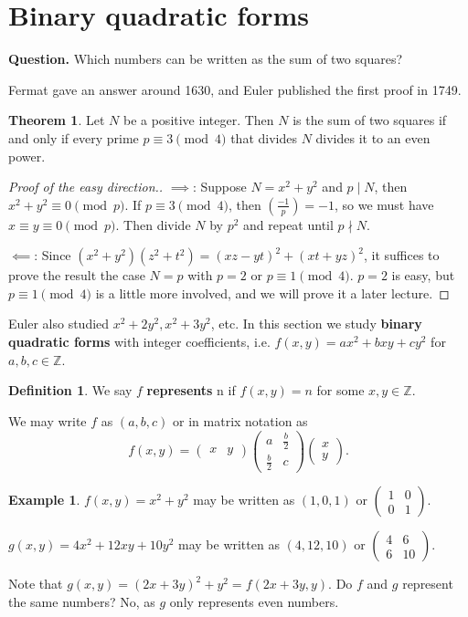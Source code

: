 \documentclass{article}
\theoremstyle{definition}
\newtheorem{theorem}{Theorem}[section]
\newtheorem{example}{Example}[section]
\newtheorem{defn}{Definition}[section]
\begin{document}
\section{Binary quadratic forms}


\textbf{Question.} Which numbers can be written as the sum of two squares?

Fermat gave an answer around 1630, and Euler published the first proof in 1749.

\begin{theorem}
    Let $N$ be a positive integer. Then $N$ is the sum of two squares if and only if every prime $p \equiv 3 \pmod{4}$ that divides $N$ divides it to an even power.
\end{theorem}
\begin{proof}[Proof of the easy direction.]
    $\implies$: Suppose $N=x^2+y^2$ and $p \mid N$, then $x^2 + y^2 \equiv 0 \pmod{p}$. If $p \equiv 3 \pmod{4}$, then $\left(\frac{-1}{p} \right) = -1$, so we must have $x\equiv y \equiv 0 \pmod{p}$. Then divide $N$ by $p^2$ and repeat until $p \nmid N$.
    \vspace{1mm}
    
    $\impliedby$: Since $(x^2+y^2)(z^2+t^2)=(xz-yt)^2+(xt+yz)^2$, it suffices to prove the result the case $N=p$ with $p=2$ or $p \equiv 1\pmod{4}$. $p=2$ is easy, but $p \equiv 1 \pmod{4}$ is a little more involved, and we will prove it a later lecture.
\end{proof}

Euler also studied $x^2+2y^2, x^2+3y^2$, etc. In this section we study \textbf{binary quadratic forms} with integer coefficients, i.e. $f(x,y)=ax^2+bxy+cy^2$ for $a,b,c \in \mathbb{Z}$.
\begin{defn}
    We say $f$ \textbf{represents} n if $f(x,y)=n$ for some $x,y \in \mathbb{Z}$.
\end{defn}
We may write $f$ as $(a,b,c)$ or in matrix notation as $$f(x,y) = \begin{pmatrix} x & y \end{pmatrix} \begin{pmatrix} a & \frac{b}{2} \\ \frac{b}{2} & c \end{pmatrix} \begin{pmatrix} x \\ y \end{pmatrix}.$$
\begin{example}
    $f(x,y)=x^2+y^2$ may be written as $(1,0,1)$ or $\begin{pmatrix} 1 & 0\\0&1 \end{pmatrix}$.

    $g(x,y) = 4x^2 + 12xy + 10y^2$ may be written as $(4,12,10)$ or $\begin{pmatrix} 4 & 6 \\6 & 10 \end{pmatrix}$.
\end{example}
Note that $g(x,y) = (2x+3y)^2+y^2 = f(2x+3y,y)$. Do $f$ and $g$ represent the same numbers? No, as $g$ only represents even numbers.
\vspace{1mm}
\end{document}
